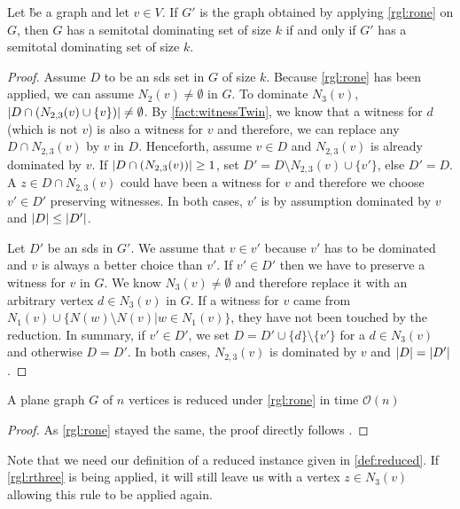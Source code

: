 \begin{lemma}\label{lemma:correctnessone}
    Let \G be a graph and let $v \in V$. If $G'$ is the graph obtained by applying \cref{rgl:rone} on $G$, then $G$ has a semitotal dominating set of size $k$ if and only if $G'$ has a semitotal dominating set of size $k$.

\end{lemma}
\begin{proof}
        Assume $D$ to be an sds set in $G$ of size $k$. 
        Because \cref{rgl:rone} has been applied, we can assume $N_{2}(v) \neq \emptyset$ in $G$.  %
        To dominate $N_3(v)$, $\abs{D \cap (N_{2,3}(v) \cup \{v\})} \neq \emptyset$.
        By \cref{fact:witnessTwin}, we know that a witness for $d$  (which is not  $v$) is also a witness for $v$ and therefore, we can replace any $D \cap N_{2,3}(v)$ by $v$ in $D$. Henceforth, assume $v \in D$ and $N_{2,3}(v)$ is already dominated by $v$.
        If $\abs{D \cap (N_{2,3}(v))} \geq 1$, set $D' = D \setminus N_{2,3}(v) \cup \{v'\}$, else $D' = D$. 
        A $z \in D \cap N_{2,3}(v)$ could have been a witness for $v$ and therefore we choose $v' \in D'$ preserving witnesses. In both cases, $v'$ is by assumption dominated by $v$ and $\abs{D} \leq \abs{D'}$.

        Let $D'$ be an sds in $G'$. We assume that $v \in v'$ because $v'$ has to be dominated and $v$ is always a better choice than $v'$.
        If $v' \in D'$  then we have to preserve a witness for $v$ in $G$. We know $N_3(v) \neq \emptyset$ and therefore replace it with an arbitrary vertex $d \in N_3(v)$ in $G$. 
        If a witness for $v$ came from $N_1(v) \cup \{ N(w) \setminus N(v) | w \in N_1(v)\}$, they have not been touched by the reduction.
        In summary, if $v' \in D'$, we set $D = D' \cup \{d\} \setminus \{v'\}$ for a $d \in N_3(v)$ and otherwise $D = D'$. 
        In both cases, $N_{2,3}(v)$ is dominated by $v$ and $\abs{D} = \abs{D'}$.
\end{proof}

\begin{lemma}
    A plane graph $G$ of $n$ vertices is reduced under \cref{rgl:rone} in time $\mathcal{O}(n)$
\end{lemma}
\begin{proof}
    As \cref{rgl:rone} stayed the same, the proof directly follows \cite[Lemma 2]{Alber2004}.
\end{proof}

Note that we need our definition of a reduced instance given in \ref{def:reduced}. If \cref{rgl:rthree} is being applied, it will still leave us with a vertex $z\in N_3(v)$ allowing this rule to be applied again.

